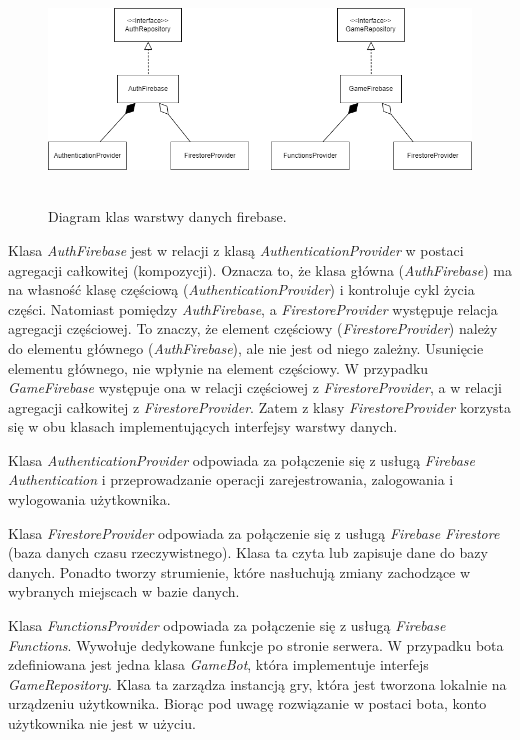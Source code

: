 \begin{figure}[h!]
	\begin{center}
		\includegraphics[width=16cm,height=6cm]{img/firebase-client.png}
	\end{center}
	\caption{{\color{dgray}Diagram klas warstwy danych firebase.}} 
	\label{firebase}
\end{figure}  

Klasa \emph{AuthFirebase} jest w relacji z klasą \emph{AuthenticationProvider} w postaci agregacji całkowitej (kompozycji). Oznacza to, że klasa główna (\emph{AuthFirebase}) ma na własność klasę częściową (\emph{AuthenticationProvider}) i kontroluje cykl życia części. Natomiast pomiędzy \emph{AuthFirebase}, a \emph{FirestoreProvider} występuje relacja agregacji częściowej. To znaczy, że element częściowy (\emph{FirestoreProvider}) należy do elementu głównego (\emph{AuthFirebase}), ale nie jest od niego zależny. Usunięcie elementu głównego, nie wpłynie na element częściowy. W przypadku \emph{GameFirebase} występuje ona w relacji częściowej z \emph{FirestoreProvider}, a w relacji agregacji całkowitej z \emph{FirestoreProvider}. Zatem z klasy \emph{FirestoreProvider} korzysta się w obu klasach implementujących interfejsy warstwy danych. 

Klasa \emph{AuthenticationProvider} odpowiada za połączenie się z usługą \emph{Firebase Authentication} i przeprowadzanie operacji zarejestrowania, zalogowania i wylogowania użytkownika. 

Klasa \emph{FirestoreProvider} odpowiada za połączenie się z usługą \emph{Firebase Firestore} (baza danych czasu rzeczywistnego). Klasa ta czyta lub zapisuje dane do bazy danych. Ponadto tworzy strumienie, które nasłuchują zmiany zachodzące w wybranych miejscach w bazie danych. 

Klasa \emph{FunctionsProvider} odpowiada za połączenie się z usługą \emph{Firebase Functions}. Wywołuje dedykowane funkcje po stronie serwera. 
W przypadku bota zdefiniowana jest jedna klasa \emph{GameBot}, która implementuje interfejs \emph{GameRepository}. Klasa ta zarządza instancją gry, która jest tworzona lokalnie na urządzeniu użytkownika. Biorąc pod uwagę rozwiązanie w postaci bota, konto użytkownika nie jest w użyciu. 

